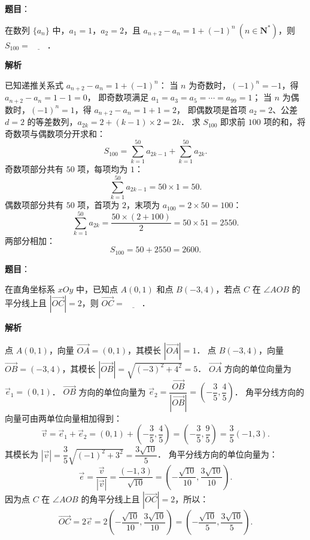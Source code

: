 \begin{answer}

\textbf{题目}：

在数列 $\{a_n\}$ 中，$a_1 = 1$，$a_2 = 2$，且 $a_{n+2} - a_n = 1 + (-1)^n\ (n \in \mathbf{N}^*)$，则 $S_{100} = \underline{\hspace{2em}}$．

\textbf{解析}

已知递推关系式 $a_{n+2} - a_n = 1 + (-1)^n$：
当 $n$ 为奇数时，$(-1)^n = -1$，得 $a_{n+2} - a_n = 1 - 1 = 0$，
即奇数项满足 $a_1 = a_3 = a_5 = \cdots = a_{99} = 1$；
当 $n$ 为偶数时，$(-1)^n = 1$，得 $a_{n+2} - a_n = 1 + 1 = 2$，
即偶数项是首项 $a_2 = 2$、公差 $d = 2$ 的等差数列，$a_{2k} = 2 + (k-1) \times 2 = 2k$．
求 $S_{100}$ 即求前 $100$ 项的和，将奇数项与偶数项分开求和：
\nopagebreak[4]
\[
S_{100} = \sum_{k=1}^{50} a_{2k-1} + \sum_{k=1}^{50} a_{2k}.
\]
奇数项部分共有 $50$ 项，每项均为 $1$：
\nopagebreak[4]
\[
\sum_{k=1}^{50} a_{2k-1} = 50 \times 1 = 50.
\]
偶数项部分共有 $50$ 项，首项为 $2$，末项为 $a_{100} = 2 \times 50 = 100$：
\nopagebreak[4]
\[
\sum_{k=1}^{50} a_{2k} = \dfrac{50 \times (2 + 100)}{2} = 50 \times 51 = 2550.
\]
两部分相加：
\nopagebreak[4]
\[
S_{100} = 50 + 2550 = 2600.
\]


\end{answer}
\begin{answer}

\textbf{题目}：

在直角坐标系 $xOy$ 中，已知点 $A(0, 1)$ 和点 $B(-3, 4)$，若点 $C$ 在 $\angle AOB$ 的平分线上且 $|\vec{OC}| = 2$，则 $\vec{OC} = \underline{\hspace{2em}}$．

\textbf{解析}

点 $A(0, 1)$，向量 $\vec{OA} = (0, 1)$，其模长 $|\vec{OA}| = 1$．
点 $B(-3, 4)$，向量 $\vec{OB} = (-3, 4)$，其模长 $|\vec{OB}| = \sqrt{(-3)^2 + 4^2} = 5$．
$\vec{OA}$ 方向的单位向量为 $\vec{e}_1 = (0, 1)$．
$\vec{OB}$ 方向的单位向量为 $\vec{e}_2 = \dfrac{\vec{OB}}{|\vec{OB}|} = \left(-\dfrac{3}{5}, \dfrac{4}{5}\right)$．
角平分线方向的向量可由两单位向量相加得到：
\nopagebreak[4]
\[
\vec{v} = \vec{e}_1 + \vec{e}_2 = (0, 1) + \left(-\dfrac{3}{5}, \dfrac{4}{5}\right) = \left(-\dfrac{3}{5}, \dfrac{9}{5}\right) = \dfrac{3}{5}(-1, 3).
\]
其模长为 $|\vec{v}| = \dfrac{3}{5} \sqrt{(-1)^2 + 3^2} = \dfrac{3\sqrt{10}}{5}$．
角平分线方向的单位向量为：
\nopagebreak[4]
\[
\vec{e} = \dfrac{\vec{v}}{|\vec{v}|} = \dfrac{(-1, 3)}{\sqrt{10}} = \left(-\dfrac{\sqrt{10}}{10}, \dfrac{3\sqrt{10}}{10}\right).
\]
因为点 $C$ 在 $\angle AOB$ 的角平分线上且 $|\vec{OC}| = 2$，所以：
\nopagebreak[4]
\[
\vec{OC} = 2\vec{e} = 2\left(-\dfrac{\sqrt{10}}{10}, \dfrac{3\sqrt{10}}{10}\right) = \left(-\dfrac{\sqrt{10}}{5}, \dfrac{3\sqrt{10}}{5}\right).
\]


\end{answer}
